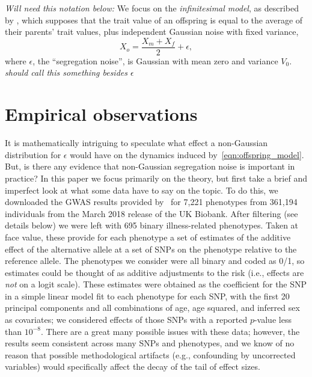 \documentclass{article}
\newcommand{\comment}[1]{{\color{blue} \it #1}}
\theoremstyle{remark}
\theoremstyle{definition}
\begin{document}
\comment{Will need this notation below:}
We focus on the \emph{infinitesimal model},
as described by \citet{barton2017infinitesimal},
which supposes that the trait value of an offspring
is equal to the average of their parents' trait values,
plus independent Gaussian noise with fixed variance,
\begin{equation} \label{eqn:offspring_model}
    X_o = \frac{X_m + X_f}{2} + \epsilon,
\end{equation}
where $\epsilon$, the ``segregation noise'',
is Gaussian with mean zero and variance $V_0$.
\comment{should call this something besides $\epsilon$}

\section{Empirical observations}

It is mathematically intriguing to speculate what effect a non-Gaussian distribution
for $\epsilon$ would have on the dynamics induced by~\eqref{eqn:offspring_model}.
But, is there any evidence that non-Gaussian segregation noise is important in practice?
In this paper we focus primarily on the theory,
but first take a brief and imperfect look at what some data have to say on the topic.
To do this, we downloaded the GWAS results provided by~\citet{biobankSNPs}
for 7,221 phenotypes from 361,194 individuals from the March 2018 release of the UK Biobank.
After filtering (see details below) we were left with 695 binary illness-related phenotypes.
Taken at face value, these provide for each phenotype a set of estimates of the additive effect
of the alternative allele at a set of SNPs on the phenotype relative to the reference allele.
The phenotypes we consider were all binary and coded as 0/1,
so estimates could be thought of as additive adjustments to the risk
(i.e., effects are \emph{not} on a logit scale).
These estimates were obtained as the coefficient for the SNP in a simple linear model
fit to each phenotype for each SNP,
with the first 20 principal components and all combinations of age, age squared, and inferred sex as covariates;
we considered effects of those SNPs with a reported $p$-value less than $10^{-8}$.
There are a great many possible issues with these data;
however, the results seem consistent across many SNPs and phenotypes,
and we know of no reason that possible methodological artifacts
(e.g., confounding by uncorrected variables)
would specifically affect the decay of the tail of effect sizes.
\end{document}
